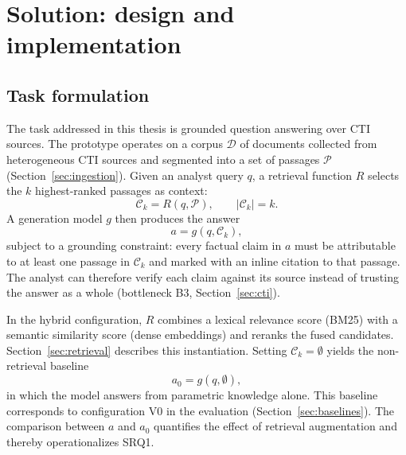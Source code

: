 \chapter{Solution: design and implementation}
\label{ch:solution}

\section{Task formulation}
\label{sec:task-formulation}

The task addressed in this thesis is grounded question answering over CTI
sources. The prototype operates on a corpus $\mathcal{D}$ of documents
collected from heterogeneous CTI sources and segmented into a set of
passages $\mathcal{P}$ (Section~\ref{sec:ingestion}). Given an analyst
query $q$, a retrieval function $R$ selects the $k$ highest-ranked passages
as context:
\begin{equation}
    \mathcal{C}_k = R(q, \mathcal{P}), \qquad \lvert\mathcal{C}_k\rvert = k.
    \label{eq:retrieval}
\end{equation}
A generation model $g$ then produces the answer
\begin{equation}
    a = g(q, \mathcal{C}_k),
    \label{eq:generation}
\end{equation}
subject to a grounding constraint: every factual claim in $a$ must be
attributable to at least one passage in $\mathcal{C}_k$ and marked with an
inline citation to that passage. The analyst can therefore verify each
claim against its source instead of trusting the answer as a whole
(bottleneck B3, Section~\ref{sec:cti}).

In the hybrid configuration, $R$ combines a lexical relevance score
(BM25) with a semantic similarity score (dense embeddings) and reranks the
fused candidates. Section~\ref{sec:retrieval} describes this instantiation.
Setting $\mathcal{C}_k = \emptyset$ yields the non-retrieval baseline
\begin{equation}
    a_0 = g(q, \emptyset),
    \label{eq:baseline}
\end{equation}
in which the model answers from parametric knowledge alone. This baseline
corresponds to configuration V0 in the evaluation
(Section~\ref{sec:baselines}). The comparison between $a$ and $a_0$
quantifies the effect of retrieval augmentation and thereby
operationalizes SRQ1.

